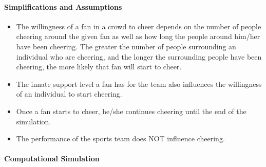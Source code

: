 \documentclass[oneside,12pt]{report}
\begin{document}
\paragraph{Simplifications and Assumptions}
	\begin{itemize}
	\item The willingness of a fan in a crowd to cheer depends on the number of people cheering around the given fan as well as how long the people around him/her have been cheering. The greater the number of people surrounding an individual who are cheering, and the longer the surrounding people have been cheering, the more likely that fan will start to cheer.
	\item The innate support level a fan has for the team also influences the willingness of an individual to start cheering.
	\item Once a fan starts to cheer, he/she continues cheering until the end of the simulation.
	\item The performance of the sports team does NOT influence cheering.
	\end{itemize}

%

\paragraph {Computational Simulation}
\end{document}
